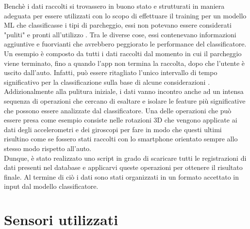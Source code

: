 Benchè i dati raccolti si trovassero in buono stato e strutturati in maniera adeguata per 
essere utilizzati con lo scopo di effettuare il training per un modello ML che classificasse
i tipi di parcheggio, essi non potevano essere considerati "puliti" e pronti all'utilizzo 
\cite{data_cleaning}.
Tra le diverse cose, essi contenevano informazioni aggiuntive e fuorvianti che avrebbero
peggiorato le performance del classificatore. Un esempio è composto da tutti i dati raccolti
dal momento in cui il parcheggio viene terminato, fino a quando l'app non termina la raccolta,
dopo che l'utente è uscito dall'auto. Infatti, può essere ritagliato l'unico intervallo di
tempo significativo per la classificazione sulla base di alcune considerazioni
\cite{smartphone_placement_within_vehicles}.\\
Addizionalmente alla pulitura iniziale, i dati vanno incontro anche ad un intensa sequenza
di operazioni che cercano di esaltare e isolare le feature più significative 
\cite{data_preprocessing_supervised_learning} che possono
essere analizzate dal classificatore. Una delle operazioni che può essere presa come esempio 
consiste nelle rotazioni 3D \cite{applications_euler_rotation_angles} che vengono applicate 
ai dati degli accelerometri e dei giroscopi
per fare in modo che questi ultimi risultino come se fossero stati raccolti con lo smartphone
orientato sempre allo stesso modo rispetto all'auto.\\
Dunque, è stato realizzato uno script in grado di scaricare tutti le registrazioni di dati
presenti nel database e applicarvi queste operazioni per ottenere il risultato finale.
Al termine di ciò i dati sono stati organizzati in un formato accettato in input dal 
modello classificatore.


\section{Sensori utilizzati} 

